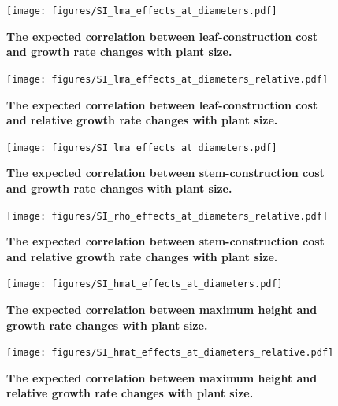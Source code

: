 \documentclass[12pt, a4paper]{article}
\begin{document}
\begin{appendices}
\newpage

\begin{figure}[htbp]
\centering
\texttt{[image: figures/SI\_lma\_effects\_at\_diameters.pdf]}
\caption{\textbf{The expected correlation between leaf-construction cost
and growth rate changes with plant size.} \label{f-lma_growth_size}}
\end{figure}

\begin{figure}[htbp]
\centering
\texttt{[image: figures/SI\_lma\_effects\_at\_diameters\_relative.pdf]}
\caption{\textbf{The expected correlation between leaf-construction cost
and relative growth rate changes with plant size.}
\label{f-lma_growth_size_relative}}
\end{figure}

\begin{figure}[htbp]
\centering
\texttt{[image: figures/SI\_lma\_effects\_at\_diameters.pdf]}
\caption{\textbf{The expected correlation between stem-construction cost
and growth rate changes with plant size.} \label{f-rho_growth_size}}
\end{figure}

\begin{figure}[htbp]
\centering
\texttt{[image: figures/SI\_rho\_effects\_at\_diameters\_relative.pdf]}
\caption{\textbf{The expected correlation between stem-construction cost
and relative growth rate changes with plant size.}
\label{f-rho_growth_size_relative}}
\end{figure}

\begin{figure}[htbp]
\centering
\texttt{[image: figures/SI\_hmat\_effects\_at\_diameters.pdf]}
\caption{\textbf{The expected correlation between maximum height and
growth rate changes with plant size.} \label{f-rho_growth_size}}
\end{figure}

\begin{figure}[htbp]
\centering
\texttt{[image: figures/SI\_hmat\_effects\_at\_diameters\_relative.pdf]}
\caption{\textbf{The expected correlation between maximum height and
relative growth rate changes with plant size.}
\label{f-hmat_growth_size_relative}}
\end{figure}

\newpage



\end{appendices}
\end{document}
